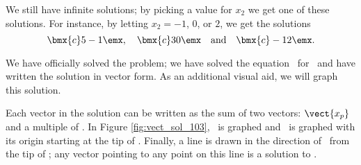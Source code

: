 {We still have infinite solutions; by picking a value for $x_2$ we get one of these solutions. For instance, by letting $x_2= -1$, $0$, or $2$, we get the solutions 
\[
\bmx{c} 5\\-1\emx, \quad \bmx{c} 3\\0\emx \quad \text{and} \quad \bmx{c} -1\\2\emx.
\]


We have officially solved the problem; we have solved the equation \ttaxb\ for \vx\ and have written the solution in vector form. As an additional visual aid, we will graph this solution. 

Each vector in the solution can be written as the sum of two vectors: $\vect{x_p}$ and a multiple of \vv. In Figure \ref{fig:vect_sol_103}, \ is graphed and \vv\ is graphed with its origin starting at the tip of . Finally, a line is drawn in the direction of \vv\ from the tip of ; any vector pointing to any point on this line is a solution to \ttaxb.

\begin{myfigure}%
\begin{center}
\end{center}
\label{fig:vect_sol_103}
\end{myfigure}
\baselineskip}

\medskip

